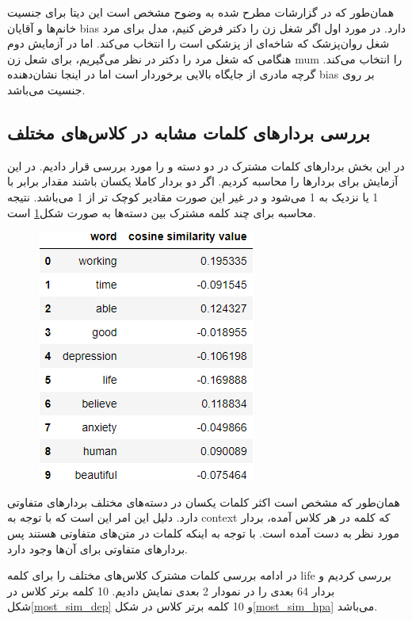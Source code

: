 \documentclass[10pt]{article}
\begin{document}
همان‌طور که در گزارشات مطرح شده به وضوح مشخص است این دیتا برای جنسیت خانم‌ها و آقایان bias دارد. در مورد اول اگر شغل زن را دکتر فرض کنیم، مدل برای مرد شغل روان‌پزشک که شاخه‌ای از پزشکی است را انتخاب می‌کند. اما در آزمایش دوم هنگامی که شغل مرد را دکتر در نظر می‌گیریم، برای شعل زن mum را انتخاب می‌کند. گرچه مادری از جایگاه بالایی برخوردار است اما در اینجا نشان‌دهنده bias بر روی جنسیت می‌باشد.

\subsection{بررسی بردار‌های کلمات مشابه  در کلاس‌های مختلف
}

در این بخش بردار‌های کلمات مشترک در دو دسته
و
 را مورد بررسی قرار دادیم. در این آزمایش برای بردار‌ها 
را محاسبه کردیم. اگر دو بردار کاملا یکسان باشند مقدار
برابر با 1 یا نزدیک به 1 می‌شود و در غیر این صورت مقادیر کوچک تر از 1 می‌باشد. نتیجه محاسبه 
برای چند کلمه مشترک بین دسته‌ها به صورت شکل\ref{cosine_similarity} است.

\begin{figure}[H]
	\centering\includegraphics[width=0.5\linewidth]{../reports/word2vec/cosine_similarity.png}
	\caption{ 
		}
	\label{cosine_similarity}
\end{figure}

همان‌طور که مشخص است اکثر کلمات یکسان در دسته‌های مختلف بردار‌های متفاوتی دارد. دلیل این امر این است که با توجه به context که کلمه در هر کلاس آمده، بردار مورد نظر به دست آمده است. با توجه به اینکه کلمات در متن‌های متفاوتی هستند پس بردار‌های متفاوتی برای آن‌ها وجود دارد.

در ادامه بررسی کلمات مشترک کلاس‌های مختلف 
را برای کلمه life بررسی کردیم و بردار 64 بعدی را در نمودار 2 بعدی نمایش دادیم. 10 کلمه برتر کلاس
در شکل\ref{most_sim_dep} و 10 کلمه برتر کلاس
در شکل\ref{most_sim_hpa} می‌باشد.
\end{document}
